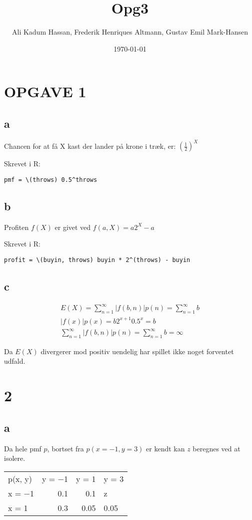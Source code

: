 \documentclass[11pt]{article}
\author{Ali Kadum Hassan, Frederik Henriques Altmann, Gustav Emil Mark-Hansen}
\date{\today}
\title{Opg3}
\begin{document}
\maketitle

\section{OPGAVE 1}
\label{sec:orge3fbc54}

\subsection{a}
\label{sec:org910bea3}
Chancen for at få X kast der lander på krone i træk, er:
\((\frac{1}{2})^X\)

Skrevet i R:
\begin{verbatim}
pmf = \(throws) 0.5^throws
\end{verbatim}
\subsection{b}
\label{sec:orgf2dfbaf}
Profiten \(f(X)\) er givet ved \(f(a, X) = a2^X - a\)

Skrevet i R:
\begin{verbatim}
profit = \(buyin, throws) buyin * 2^(throws) - buyin
\end{verbatim}
\subsection{c}
\label{sec:org54263c6}
\begin{align}
E(X) = \sum_{n=1}^\infty |f(b,n)|p(n) = \sum_{n=1}^\infty b \\
|f(x)|p(x) = b2^{x+1}0.5^x = b \\
\sum_{n=1}^\infty |f(b,n)|p(n) = \sum_{n=1}^\infty b = \infty
\end{align}

Da \(E(X)\) divergerer mod positiv uendelig har spillet ikke noget forventet udfald.
\section{2}
\label{sec:orga1b3501}
\subsection{a}
\label{sec:org9707988}
Da hele pmf \(p\), bortset fra \(p(x=-1,y=3)\) er kendt kan \(z\) beregnes ved at isolere.

\begin{center}
\begin{tabular}{lrrl}
p(x, y) & y = −1 & y = 1 & y = 3\\
x = −1 & 0.1 & 0.1 & z\\
x = 1 & 0.3 & 0.05 & 0.05\\
\end{tabular}
\end{center}
\end{document}
